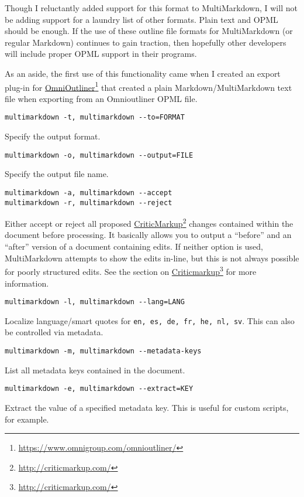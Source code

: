 Though I reluctantly added support for this format to MultiMarkdown, I will not be adding support for a laundry list of other formats. Plain text and OPML should be enough. If the use of these outline file formats for MultiMarkdown (or regular Markdown) continues to gain traction, then hopefully other developers will include proper OPML support in their programs.

As an aside, the first use of this functionality came when I created an export plug-in for \href{https://www.omnigroup.com/omnioutliner/}{OmniOutliner}\footnote{\href{https://www.omnigroup.com/omnioutliner/}{https:\slash{}\slash{}www.omnigroup.com\slash{}omnioutliner\slash{}}} that created a plain Markdown\slash{}MultiMarkdown text file when exporting from an Omnioutliner OPML file.

\begin{verbatim}
multimarkdown -t, multimarkdown --to=FORMAT
\end{verbatim}

Specify the output format.

\begin{verbatim}
multimarkdown -o, multimarkdown --output=FILE
\end{verbatim}

Specify the output file name.

\begin{verbatim}
multimarkdown -a, multimarkdown --accept
multimarkdown -r, multimarkdown --reject
\end{verbatim}

Either accept or reject all proposed \href{http://criticmarkup.com/}{CriticMarkup}\footnote{\href{http://criticmarkup.com/}{http:\slash{}\slash{}criticmarkup.com\slash{}}} changes contained within the document before processing. It basically allows you to output a ``before'' and an ``after'' version of a document containing edits. If neither option is used, MultiMarkdown attempts to show the edits in-line, but this is not always possible for poorly structured edits. See the section on \href{http://criticmarkup.com/}{Criticmarkup}\footnote{\href{http://criticmarkup.com/}{http:\slash{}\slash{}criticmarkup.com\slash{}}} for more information.

\begin{verbatim}
multimarkdown -l, multimarkdown --lang=LANG
\end{verbatim}

Localize language\slash{}smart quotes for \texttt{en, es, de, fr, he, nl, sv}. This can also be controlled via metadata.

\begin{verbatim}
multimarkdown -m, multimarkdown --metadata-keys
\end{verbatim}

List all metadata keys contained in the document.

\begin{verbatim}
multimarkdown -e, multimarkdown --extract=KEY
\end{verbatim}

Extract the value of a specified metadata key. This is useful for custom scripts, for example.



